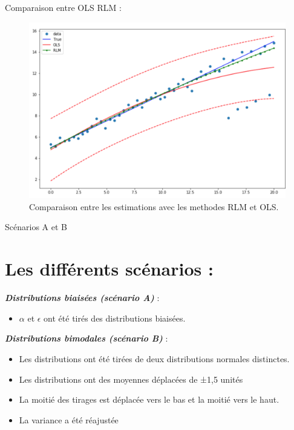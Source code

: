 \documentclass[unknownkeysallowed]{beamer}
\begin{document}
  
  
  \begin{frame}{Comparaison entre OLS RLM : }

\begin{figure}
\includegraphics[scale=0.28]{0.png}
\caption{Comparaison entre les estimations avec les methodes RLM et OLS.}
\end{figure}
\end{frame}

  
  
  
  



\begin{frame}{Scénarios A et B}
\section{Les différents scénarios :}
 \textbf{\textit{Distributions biaisées (scénario A)}} :
 
 \begin{itemize}
 
        \item $\alpha$ et $\epsilon$ ont été tirés des distributions biaisées.

    \end{itemize}
 \textbf{\textit{Distributions bimodales (scénario B)}} :
 \begin{itemize}
 
        \item  Les distributions ont été tirées de deux distributions normales distinctes.
 				 \item  Les distributions ont des moyennes déplacées de  ±1,5 unités
  	 			\item La moitié des tirages est déplacée vers le bas et la moitié vers le haut.
  				\item La variance a été  réajustée
  \end{itemize}
\end{frame}
\end{document}
